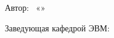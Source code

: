 \begin{singlespace}
	\vspace{\verticalspacesize}


	\noindent
	Автор: \authorwithinitials~«\uline{\hspace{\daysize}}»
	\uline{\hspace{6em}}
	\customtheyear
	\hfill
	\uline{\hspace{\signaturesize}}\hspace{\rightindentwithyear}

	\vspace{-0.3em}
	\hfill
	\hspace{\rightindentwithyear}

	\vspace{\verticalspacesize}

	\confirm
	\uline{\hfill}\customtheyear\hspace{\rightindent}

	\vspace{\verticalspacesize}

	\noindent
	Заведующая кафедрой ЭВМ: \headofdepartment
	\hfill
	\uline{\hspace{\signaturesize}}\hspace{\rightindentwithyear}

	\vspace{-0.3em}
	\hfill
	\hspace{\rightindentwithyear}

\end{singlespace}

